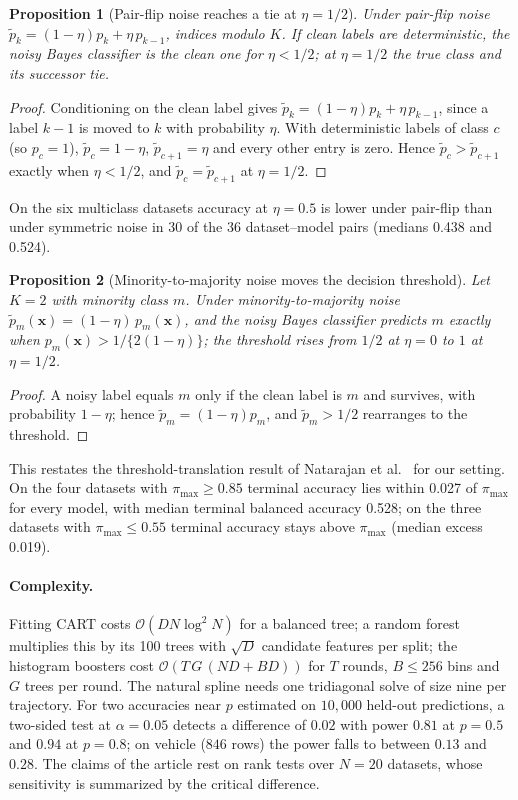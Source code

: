 \documentclass[pdflatex,sn-mathphys]{sn-jnl}
\theoremstyle{thmstyleone}
\newtheorem{appproposition}{Proposition}
\theoremstyle{thmstyletwo}
\theoremstyle{thmstylethree}
\begin{document}
\begin{appendices}
\begin{appproposition}[Pair-flip noise reaches a tie at $\eta=1/2$]\label{prop:a_pairflip_tie}
Under pair-flip noise $\tilde{p}_k=(1-\eta)p_k+\eta\,p_{k-1}$, indices modulo $K$. If clean labels are deterministic, the noisy Bayes classifier is the clean one for $\eta<1/2$; at $\eta=1/2$ the true class and its successor tie.
\end{appproposition}
\begin{proof}
Conditioning on the clean label gives $\tilde{p}_k=(1-\eta)p_k+\eta\,p_{k-1}$, since a label $k-1$ is moved to $k$ with probability $\eta$. With deterministic labels of class $c$ (so $p_c=1$), $\tilde{p}_c=1-\eta$, $\tilde{p}_{c+1}=\eta$ and every other entry is zero. Hence $\tilde{p}_c>\tilde{p}_{c+1}$ exactly when $\eta<1/2$, and $\tilde{p}_c=\tilde{p}_{c+1}$ at $\eta=1/2$.
\end{proof}
On the six multiclass datasets accuracy at $\eta=0.5$ is lower under pair-flip than under symmetric noise in 30 of the 36 dataset--model pairs (medians 0.438 and 0.524).

\begin{appproposition}[Minority-to-majority noise moves the decision threshold]\label{prop:a_minority}
Let $K=2$ with minority class $m$. Under minority-to-majority noise $\tilde{p}_m(\mathbf{x})=(1-\eta)\,p_m(\mathbf{x})$, and the noisy Bayes classifier predicts $m$ exactly when $p_m(\mathbf{x})>1/\{2(1-\eta)\}$; the threshold rises from $1/2$ at $\eta=0$ to $1$ at $\eta=1/2$.
\end{appproposition}
\begin{proof}
A noisy label equals $m$ only if the clean label is $m$ and survives, with probability $1-\eta$; hence $\tilde{p}_m=(1-\eta)p_m$, and $\tilde{p}_m>1/2$ rearranges to the threshold.
\end{proof}
This restates the threshold-translation result of Natarajan et al.~\cite{natarajan2013learning} for our setting. On the four datasets with $\pi_{\max}\ge0.85$ terminal accuracy lies within 0.027 of $\pi_{\max}$ for every model, with median terminal balanced accuracy 0.528; on the three datasets with $\pi_{\max}\le0.55$ terminal accuracy stays above $\pi_{\max}$ (median excess 0.019).

\paragraph{Complexity.} Fitting CART costs $\mathcal{O}(DN\log^{2}N)$ for a balanced tree; a random forest multiplies this by its 100 trees with $\sqrt D$ candidate features per split; the histogram boosters cost $\mathcal{O}(T\,G\,(ND+BD))$ for $T$ rounds, $B\le256$ bins and $G$ trees per round. The natural spline needs one tridiagonal solve of size nine per trajectory. For two accuracies near $p$ estimated on $10{,}000$ held-out predictions, a two-sided test at $\alpha=0.05$ detects a difference of $0.02$ with power $0.81$ at $p=0.5$ and $0.94$ at $p=0.8$; on vehicle ($846$ rows) the power falls to between $0.13$ and $0.28$. The claims of the article rest on rank tests over $N=20$ datasets, whose sensitivity is summarized by the critical difference.

\end{appendices}
\end{document}
